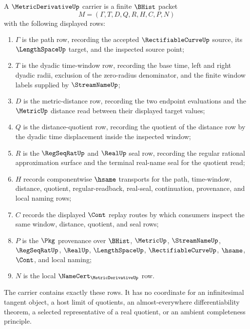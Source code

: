 \begin{definition}
\label{def:metric-derivative-carrier}
A $\MetricDerivativeUp$ carrier is a finite $\BHist$ packet
$$
M=(\Gamma,T,D,Q,R,H,C,P,N)
$$
with the following displayed rows:
\begin{enumerate}
\item $\Gamma$ is the path row, recording the accepted $\RectifiableCurveUp$ source, its $\LengthSpaceUp$ target, and the inspected source point;
\item $T$ is the dyadic time-window row, recording the base time, left and right dyadic radii, exclusion of the zero-radius denominator, and the finite window labels supplied by $\StreamNameUp$;
\item $D$ is the metric-distance row, recording the two endpoint evaluations and the $\MetricUp$ distance read between their displayed target values;
\item $Q$ is the distance-quotient row, recording the quotient of the distance row by the dyadic time displacement inside the inspected window;
\item $R$ is the $\RegSeqRatUp$ and $\RealUp$ seal row, recording the regular rational approximation surface and the terminal real-name seal for the quotient read;
\item $H$ records componentwise $\hsame$ transports for the path, time-window, distance, quotient, regular-readback, real-seal, continuation, provenance, and local naming rows;
\item $C$ records the displayed $\Cont$ replay routes by which consumers inspect the same window, distance, quotient, and seal rows;
\item $P$ is the $\Pkg$ provenance over $\BHist$, $\MetricUp$, $\StreamNameUp$, $\RegSeqRatUp$, $\RealUp$, $\LengthSpaceUp$, $\RectifiableCurveUp$, $\hsame$, $\Cont$, and local naming;
\item $N$ is the local $\NameCert_{\MetricDerivativeUp}$ row.
\end{enumerate}
The carrier contains exactly these rows. It has no coordinate for an infinitesimal tangent object, a host limit of quotients, an almost-everywhere differentiability theorem, a selected representative of a real quotient, or an ambient completeness principle.
\end{definition}


